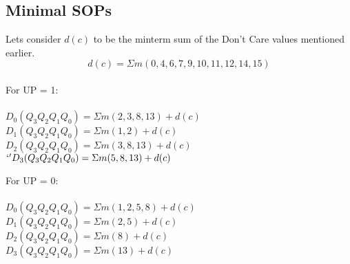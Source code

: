 \documentclass[11pt,a4paper,english]{article}
\begin{document}
  \subsection*{Minimal SOPs}

    Lets consider $d(c)$ to be the minterm sum of the Don't Care values mentioned earlier. \\
    \begin{equation}
        d(c) = \Sigma m(0,4,6,7,9,10,11,12,14,15)
    \end{equation} \\ 

    For UP = 1: \\
    \\
    \begin{math}
        D_0(Q_3 Q_2 Q_1 Q_0) = \Sigma m(2,3,8,13) + d(c)
    \end{math} \vspace{5pt}
    \\
    \begin{math} 
        D_1(Q_3 Q_2 Q_1 Q_0) = \Sigma m(1,2) + d(c)
    \end{math} \vspace{5pt}
    \\
    \begin{math} 
        D_2(Q_3 Q_2 Q_1 Q_0) = \Sigma m(3,8,13) + d(c)
    \end{math} \vspace{5pt}
    \\
    \begin{math}`'
        D_3(Q_3 Q_2 Q_1 Q_0) = \Sigma m(5,8,13) + d(c) 
    \end{math} \vspace{10pt}
    
    For UP = 0: \\
    \\
    \begin{math}
        D_0(Q_3 Q_2 Q_1 Q_0) = \Sigma m(1,2,5,8) + d(c)
    \end{math} \vspace{5pt}
    \\
    \begin{math}
        D_1(Q_3 Q_2 Q_1 Q_0) = \Sigma m(2,5) + d(c)
    \end{math} \vspace{5pt}
    \\
    \begin{math}
        D_2(Q_3 Q_2 Q_1 Q_0) = \Sigma m(8) + d(c)           \hspace{20pt}
    \end{math} \vspace{5pt}
    \\
    \begin{math}
        D_3(Q_3 Q_2 Q_1 Q_0) = \Sigma m(13) + d(c)
    \end{math}
    \\          
    
\end{document}
